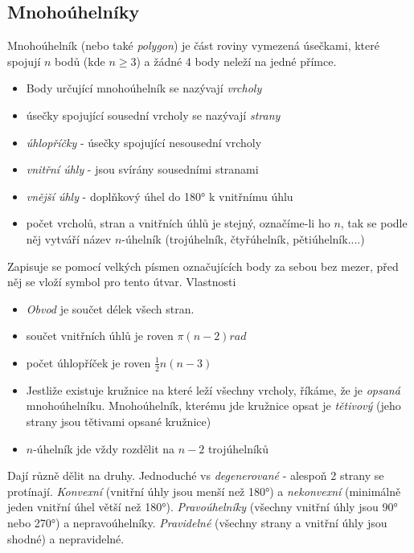 \documentclass[12pt]{article}
\begin{document}
\subsection{Mnohoúhelníky}
Mnohoúhelník (nebo také \emph{polygon}) je část roviny vymezená úsečkami, které spojují $n$ bodů (kde $n\geq3$) a žádné 4 body neleží na jedné přímce.
\begin{itemize}
\item Body určující mnohoúhelník se nazývají \emph{vrcholy}
\item úsečky spojující sousední vrcholy se nazývají \emph{strany}
\item \emph{úhlopříčky} - úsečky spojující nesousední vrcholy
\item \emph{vnitřní úhly} - jsou svírány sousedními stranami
\item \emph{vnější úhly} - doplňkový úhel do 180° k vnitřnímu úhlu
\item počet vrcholů, stran a vnitřních úhlů je stejný, označíme-li ho $n$, tak se podle něj vytváří název $n$-úhelník (trojúhelník, čtyřúhelník, pětiúhelník....)
\end{itemize}
Zapisuje se pomocí velkých písmen označujících body za sebou bez mezer, před něj se vloží symbol pro tento útvar. Vlastnosti
\begin{itemize}
\item \emph{Obvod} je součet délek všech stran.
\item součet vnitřních úhlů je roven $\pi \left(n-2\right) rad$ 
\item počet úhlopříček je roven $\frac{1}{2}n(n-3)$
\item Jestliže existuje kružnice na které leží všechny vrcholy, říkáme, že je \emph{opsaná} mnohoúhelníku. Mnohoúhelník, kterému jde kružnice opsat je \emph{tětivový} (jeho strany jsou tětivami opsané kružnice)
\item $n$-úhelník jde vždy rozdělit na $n-2$ trojúhelníků
\end{itemize}
Dají různě dělit na druhy. Jednoduché vs \emph{degenerované} - alespoň 2 strany se protínají. \emph{Konvexní} (vnitřní úhly jsou menší než 180°) a \emph{nekonvexní} (minimálně jeden vnitřní úhel větší než 180°). \emph{Pravoúhelníky} (všechny vnitřní úhly jsou 90° nebo 270°) a nepravoúhelníky. \emph{Pravidelné} (všechny strany a vnitřní úhly jsou shodné) a nepravidelné.\\
\end{document}
